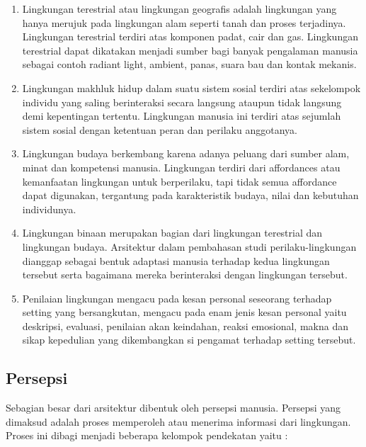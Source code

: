 \documentclass[../manperil.tex]{subfiles}
\begin{document}
\begin{enumerate}
	\item Lingkungan terestrial atau lingkungan geografis adalah lingkungan yang hanya merujuk pada lingkungan alam seperti tanah dan proses terjadinya. Lingkungan terestrial terdiri atas komponen padat, cair dan gas. Lingkungan terestrial dapat dikatakan menjadi sumber bagi banyak pengalaman manusia sebagai contoh radiant light, ambient, panas, suara bau dan kontak mekanis.
	\item Lingkungan makhluk hidup dalam suatu sistem sosial terdiri atas sekelompok individu yang saling berinteraksi secara langsung ataupun tidak langsung demi kepentingan tertentu. Lingkungan manusia ini terdiri atas sejumlah sistem sosial dengan ketentuan peran dan perilaku anggotanya.
	\item Lingkungan budaya berkembang karena adanya peluang dari sumber alam, minat dan kompetensi manusia. Lingkungan terdiri dari affordances atau kemanfaatan lingkungan untuk berperilaku, tapi tidak semua affordance dapat digunakan, tergantung pada karakteristik budaya, nilai dan kebutuhan individunya.
	\item Lingkungan binaan merupakan bagian dari lingkungan terestrial dan lingkungan budaya. Arsitektur dalam pembahasan studi perilaku-lingkungan dianggap sebagai bentuk adaptasi manusia terhadap kedua lingkungan tersebut serta bagaimana mereka berinteraksi dengan lingkungan tersebut.
	\item Penilaian lingkungan mengacu pada kesan personal seseorang terhadap setting yang bersangkutan, mengacu pada enam jenis kesan personal yaitu deskripsi, evaluasi, penilaian akan keindahan, reaksi emosional, makna dan sikap kepedulian yang dikembangkan si pengamat terhadap setting tersebut.
\end{enumerate}

\subsection{Persepsi}%
\label{sub:persepsi}

Sebagian besar dari arsitektur dibentuk oleh persepsi manusia. Persepsi yang dimaksud adalah proses memperoleh atau menerima informasi dari lingkungan. Proses ini dibagi menjadi beberapa kelompok pendekatan yaitu :
\end{document}

